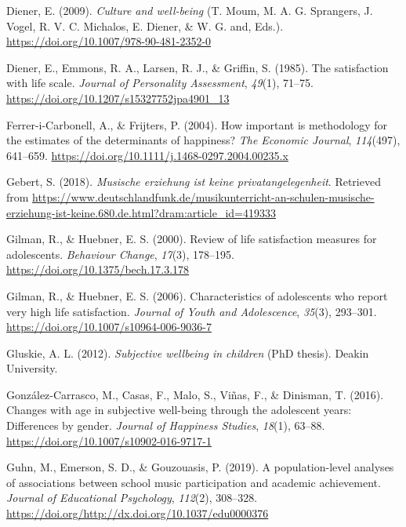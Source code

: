 \documentclass[a4, 12pt]{article}
\begin{document}
\leavevmode\hypertarget{ref-Diener2009}{}%
Diener, E. (2009). \emph{Culture and well-being} (T. Moum, M. A. G. Sprangers, J. Vogel, R. V. C. Michalos, E. Diener, \& W. G. and, Eds.). \url{https://doi.org/10.1007/978-90-481-2352-0}

\leavevmode\hypertarget{ref-Diener1985}{}%
Diener, E., Emmons, R. A., Larsen, R. J., \& Griffin, S. (1985). The satisfaction with life scale. \emph{Journal of Personality Assessment}, \emph{49}(1), 71--75. \url{https://doi.org/10.1207/s15327752jpa4901_13}

\leavevmode\hypertarget{ref-iCarbonell2004}{}%
Ferrer-i-Carbonell, A., \& Frijters, P. (2004). How important is methodology for the estimates of the determinants of happiness? \emph{The Economic Journal}, \emph{114}(497), 641--659. \url{https://doi.org/10.1111/j.1468-0297.2004.00235.x}

\leavevmode\hypertarget{ref-Gebert2018}{}%
Gebert, S. (2018). \emph{Musische erziehung ist keine privatangelegenheit}. Retrieved from \url{https://www.deutschlandfunk.de/musikunterricht-an-schulen-musische-erziehung-ist-keine.680.de.html?dram:article_id=419333}

\leavevmode\hypertarget{ref-Gilman2000}{}%
Gilman, R., \& Huebner, E. S. (2000). Review of life satisfaction measures for adolescents. \emph{Behaviour Change}, \emph{17}(3), 178--195. \url{https://doi.org/10.1375/bech.17.3.178}

\leavevmode\hypertarget{ref-Gilman2006}{}%
Gilman, R., \& Huebner, E. S. (2006). Characteristics of adolescents who report very high life satisfaction. \emph{Journal of Youth and Adolescence}, \emph{35}(3), 293--301. \url{https://doi.org/10.1007/s10964-006-9036-7}

\leavevmode\hypertarget{ref-Gluskie2012}{}%
Gluskie, A. L. (2012). \emph{Subjective wellbeing in children} (PhD thesis). Deakin University.

\leavevmode\hypertarget{ref-GonzalezCarrasco2016}{}%
González-Carrasco, M., Casas, F., Malo, S., Viñas, F., \& Dinisman, T. (2016). Changes with age in subjective well-being through the adolescent years: Differences by gender. \emph{Journal of Happiness Studies}, \emph{18}(1), 63--88. \url{https://doi.org/10.1007/s10902-016-9717-1}

\leavevmode\hypertarget{ref-Guhn2019}{}%
Guhn, M., Emerson, S. D., \& Gouzouasis, P. (2019). A population-level analyses of associations between school music participation and academic achievement. \emph{Journal of Educational Psychology}, \emph{112}(2), 308--328. \url{https://doi.org/http://dx.doi.org/10.1037/edu0000376}
\end{document}

